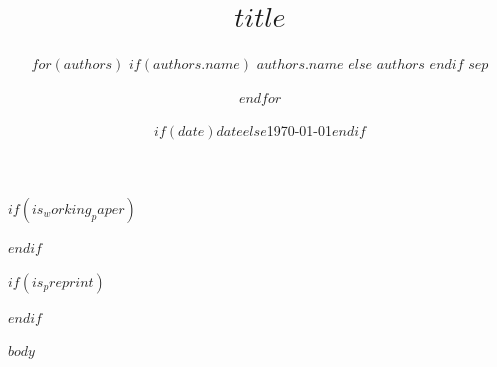 \documentclass[11pt]{article}
\title{$title$}
\author{
$for(authors)$
$if(authors.name)$
$authors.name$
$else$
$authors$
$endif$
$sep$ \and
$endfor$
}
\date{$if(date)$$date$$else$\today$endif$}
\begin{document}
$if(is_working_paper)$
\maketitle
$endif$

$if(is_preprint)$

$endif$

$body$
\end{document}
